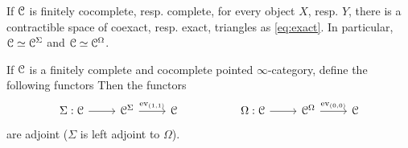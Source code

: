 \documentclass[10pt]{amsart}
\numberwithin{equation}{section}
\begin{document}
If $\mathcal{C}$ is finitely cocomplete, resp. complete, for every object $X$, resp. $Y$, there is a contractible space of coexact, resp. exact, triangles as \cref{eq:exact}. In particular, $\mathcal{C}\simeq\mathcal{C}^\Sigma$ and $\mathcal{C}\simeq\mathcal{C}^\Omega$.  
\begin{proposition}
  If $\mathcal{C}$ is a finitely complete and cocomplete pointed $\infty$-category, define the following functors Then the functors
  \begin{equation}
    \begin{tikzcd}
      \Sigma:\lC \arrow[r] & \lC^\Sigma \arrow[r,"\mathrm{ev}_{(1,1)}"] & \lC  & & \Omega:\lC \arrow[r] & \lC^\Omega \arrow[r,"\mathrm{ev}_{(0,0)}"] & \lC
    \end{tikzcd}
  \end{equation}are adjoint ($\Sigma$ is left adjoint to $\Omega$). 
\end{proposition}
\end{document}
